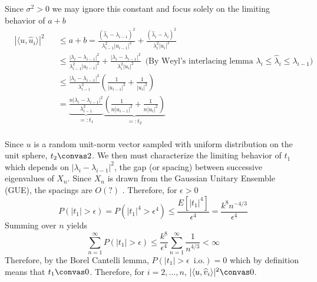 Since $\sigma^2>0$ we may ignore this constant and focus solely on the limiting behavior of $a+b$
\begin{equation*}
  \begin{aligned}
    &|\langle u,\widehat{u}_i\rangle|^2 &&\leq a+b = \frac{\left(\widehat{\lambda}_i-\lambda_{i-1}\right)^2}{\lambda_{i-1}^2|u_{i-1}|^2}+ \frac{\left(\widehat{\lambda}_i-\lambda_{i}\right)^2}{\lambda_i^2|u_{i}|^2}\\
    &&& \leq \frac{|\lambda_i-\lambda_{i-1}|^2}{\lambda_{i-1}^2|u_{i-1}|^2} + \frac{|\lambda_i-\lambda_{i-1}|^2}{\lambda_i^2|u_{i}|^2} \,\,\,\text{(By Weyl's interlacing lemma } \lambda_i\leq \widehat{\lambda}_i\leq\lambda_{i-1})\\
    &&&\leq \frac{|\lambda_i-\lambda_{i-1}|^2}{\lambda_{i-1}^2}\left(\frac{1}{|u_{i-1}|^2} + \frac{1}{|u_i|^2}\right)\\
    &&&= \underbrace{\frac{n|\lambda_i-\lambda_{i-1}|^2}{\lambda_{i-1}^2}}_{=:t_1}\underbrace{\left(\frac{1}{n|u_{i-1}|^2} + \frac{1}{n|u_i|^2}\right)}_{=:t_2}\\
  \end{aligned}
\end{equation*}

Since $u$ is a random unit-norm vector sampled with uniform distribution on the unit sphere, $t_2\convas 2$. We then must characterize the limiting behavior of $t_1$ which depends on $|\lambda_i-\lambda_{i-1}|^2$, the gap (or spacing) between successive eigenvalues of $X_n$. Since $X_n$ is drawn from the Gaussian Unitary Ensemble (GUE), the spacings are $O(?)$ \cite{someone}. Therefore, for $\epsilon>0$
\begin{equation*}
P(|t_1|>\epsilon) = P(|t_1|^4 > \epsilon^4)\leq \frac{E[|t_1|^4]}{\epsilon^4}= \frac{k^{8}n^{-4/3}}{\epsilon^4}
\end{equation*}
Summing over $n$ yields
\begin{equation*}
\sum_{n=1}^\infty P(|t_1|>\epsilon) \leq \frac{k^{8}}{\epsilon^4}\sum_{n=1}^\infty \frac{1}{n^{4/3}}< \infty
\end{equation*}
Therefore, by the Borel Cantelli lemma, $P(|t_1|>\epsilon \,\text{ i.o.}) = 0$ which by definition means that $t_1\convas0$. Therefore, for $i=2,\dots,n$, $|\langle u,\widehat{v}_i\rangle|^2\convas 0$. 

